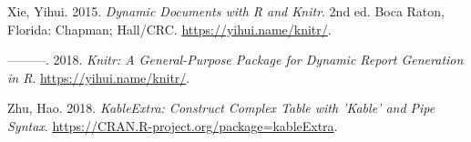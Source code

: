 \documentclass[]{elsarticle} %
\begin{document}
\leavevmode\hypertarget{ref-Xie2015}{}%
Xie, Yihui. 2015. \emph{Dynamic Documents with R and Knitr}. 2nd ed.
Boca Raton, Florida: Chapman; Hall/CRC. \url{https://yihui.name/knitr/}.

\leavevmode\hypertarget{ref-Xie2018}{}%
---------. 2018. \emph{Knitr: A General-Purpose Package for Dynamic
Report Generation in R}. \url{https://yihui.name/knitr/}.

\leavevmode\hypertarget{ref-Zhu2018}{}%
Zhu, Hao. 2018. \emph{KableExtra: Construct Complex Table with 'Kable'
and Pipe Syntax}. \url{https://CRAN.R-project.org/package=kableExtra}.
\end{document}
